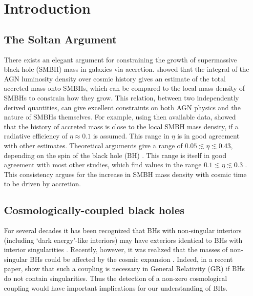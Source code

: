 \documentclass[twocolumn]{aastex631}
\begin{document}


\section{Introduction} \label{sec:intro}

\subsection{The Soltan Argument}
There exists an elegant argument for constraining the growth of supermassive black hole (SMBH) mass in galaxies via accretion. \citet{1982MNRAS.200..115S} showed that the integral of the AGN luminosity density over cosmic history gives an estimate of the total accreted mass onto SMBHs, which can be compared to the local mass density of SMBHs to constrain how they grow. This relation, between two independently derived quantities, can give excellent constraints on both AGN physics and the nature of SMBHs themselves.  For example, using then available data, \citet{1982MNRAS.200..115S} showed that the history of accreted mass is close to the local SMBH mass density, if a radiative efficiency of $\eta\approx 0.1$ is assumed.  This range in $\eta$ is in good agreement with other estimates. Theoretical arguments give a range of $0.05\lesssim\eta\lesssim0.43$, depending on the spin of the black hole (BH) \citep{1970Natur.226...64B,1974ApJ...191..507T}. This range is itself in good agreement with most other studies, which find values in the range $0.1\lesssim\eta\lesssim0.3$ \citep[e.g.][]{2002MNRAS.335..965Y,2002ApJ...565L..75E,2007ApJ...654..731H, 2009ApJ...690...20S,2015ApJ...802..102L,2017SCPMA..60j9511Z,2020MNRAS.493.1500S, 2020MNRAS.495.3252S,farrah22}. This consistency argues for the increase in SMBH mass density with cosmic time to be driven by accretion. 

\subsection{Cosmologically-coupled black holes}
 
For several decades it has been recognized that BHs with non-singular interiors (including `dark energy'-like interiors) may have exteriors identical to BHs with interior singularities \citep[e.g.][]{1966JETP...22..378G,1992GReGr..24..235D,farja07, 2019PhRvD..99d4037B,2023arXiv230916444C}. Recently, however, it was realized that the masses of non-singular BHs could be affected by the cosmic expansion \citep{cw19}. Indeed, in a recent paper, \citet{2023JCAP...11..007C} show that such a coupling is necessary in General Relativity (GR) if BHs do not contain singularities. Thus the detection of a non-zero cosmological coupling would have important implications for our understanding of BHs.
\end{document}
